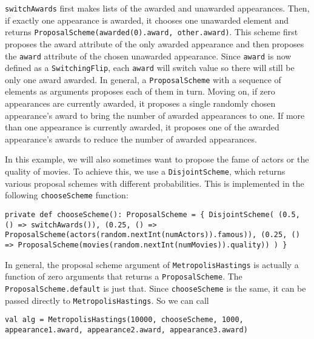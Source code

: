 \texttt{switchAwards} first makes lists of the awarded and unawarded appearances. Then, if exactly one appearance is awarded, it chooses one unawarded element and returns \texttt{ProposalScheme(awarded(0).award, other.award)}. This scheme first proposes the award attribute of the only awarded appearance and then proposes the \texttt{award} attribute of the chosen unawarded appearance. Since \texttt{award} is now defined as a \texttt{SwitchingFlip}, each \texttt{award} will switch value so there will still be only one award awarded. In general, a \texttt{ProposalScheme} with a sequence of elements as arguments proposes each of them in turn. Moving on, if zero appearances are currently awarded, it proposes a single randomly chosen appearance's award to bring the number of awarded appearances to one. If more than one appearance is currently awarded, it proposes one of the awarded appearance's awards to reduce the number of awarded appearances.

In this example, we will also sometimes want to propose the fame of actors or the quality of movies. To achieve this, we use a \texttt{Disjoint\-Scheme}, which returns various proposal schemes with different probabilities. This is implemented in the following \texttt{chooseScheme} function:

\begin{flushleft}
\texttt{private def chooseScheme(): ProposalScheme = \{ 
\newline \tab DisjointScheme(
\newline \tab (0.5, () => switchAwards()), 
\newline \tab (0.25, () => 
\newline \tab ProposalScheme(actors(random.nextInt(numActors)).famous)), 
\newline \tab (0.25, () =>
\newline \tab ProposalScheme(movies(random.nextInt(numMovies)).quality))
\newline )
\newline \}
}
\end{flushleft}

In general, the proposal scheme argument of \texttt{MetropolisHastings} is actually a function of zero arguments that returns a \texttt{ProposalScheme}. The \texttt{ProposalScheme.default} is just that. Since \texttt{chooseScheme} is the same, it can be passed directly to \texttt{MetropolisHastings}. So we can call

\begin{flushleft}
\texttt{val alg =
\newline \tab MetropolisHastings(10000, chooseScheme, 1000, appearance1.award, appearance2.award, appearance3.award) }
\end{flushleft}

